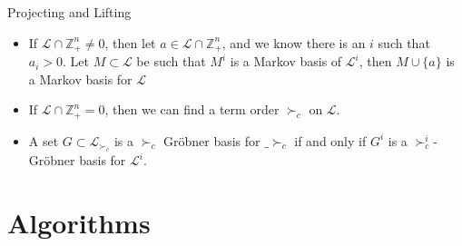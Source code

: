 \documentclass[9pt]{beamer}
\newcommand\Z{\mathbb{Z}}
\theoremstyle{definition}
\begin{document}
\begin{frame}[fragile]{Projecting and Lifting}
  \begin{lemma}
    \begin{itemize}
    \item If $\mathcal{L} \cap \Z^n_+ \neq 0$, then let $a \in \mathcal{L} \cap \Z^n_+$,
      and we know there is an $i$ such that $a_i > 0$.
      Let $M \subset \mathcal{L}$ be such that $M^i$ is a Markov basis of
      $\mathcal{L}^i$, then $M \cup \{a\}$ is a Markov basis for $\mathcal{L}$
    \item If $\mathcal{L} \cap \Z^n_+ = 0$, then we can find a term order $\succ_c$ on $\mathcal{L}$.
    \item A set $G \subset \mathcal{L}_{\succ_c}$ is a $\succ_c$ Gr\"obner basis for $\mathcal_{\succ_c}$ if and only if $G^i$ is a $\succ_c^i$-Gr\"obner basis for $\mathcal{L}^i$.
    \end{itemize}
  \end{lemma}
\end{frame}

\section{Algorithms}
\end{document}
